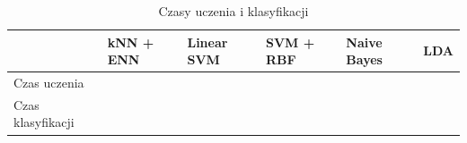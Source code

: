 \documentclass[[10pt,a4paper]{article}
\begin{document}
\begin{table}[h]
\centering
\caption{Czasy uczenia i klasyfikacji}
\label{timesTable}
\begin{tabular}{l|l|l|l|l|l|}
\cline{2-6}
                                        & kNN + ENN & Linear SVM & SVM + RBF & Naive Bayes & LDA \\ \hline
\multicolumn{1}{|l|}{Czas uczenia}      &           &            &           &             &     \\ \hline
\multicolumn{1}{|l|}{Czas klasyfikacji} &           &            &           &             &     \\ \hline
\end{tabular}
\end{table}
\end{document}
